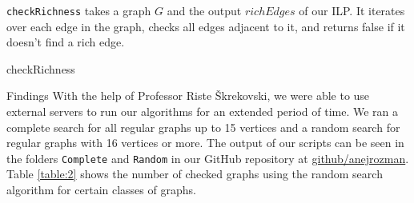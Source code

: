 \documentclass[12pt,a4paper]{amsart}
\makeatletter
\renewcommand\section{\@startsection{section}{1}
  \z@{.5\linespacing\@plus.7\linespacing}{.5\linespacing}
  {\normalfont\scshape\large\centering}}
\theoremstyle{definition} %
\theoremstyle{plain} %
\makeatother
\begin{document}
    \texttt{checkRichness} takes a graph $G$ and the output $richEdges$ of our ILP. It iterates over each edge in the graph, checks all edges adjacent to it, and returns false if it doesn't find a rich edge.\\

    \begin{algorithm}[!htbp]
        \caption{checkRichness}\label{algo:checkRichness}
        \LinesNumberedHidden
        \DontPrintSemicolon
        
        
        
        \Return {}\;
    \end{algorithm}

\pagebreak

\section{Findings}
    With the help of Professor Riste Škrekovski, we were able to use external servers to run our algorithms for an extended period of time. We ran a complete search for all regular graphs up to 15 vertices and a random search for regular graphs with 16 vertices or more. The output of our scripts can be seen in the folders \texttt{Complete} and \texttt{Random} in our GitHub repository at \href{https://github.com/anejrozman/Rich-neighbour-edge-coloring}{github/anejrozman}. Table \ref{table:2} shows the number of checked graphs using the random search algorithm for certain classes of graphs.
\end{document}
